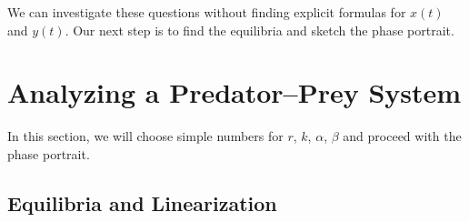\documentclass[10pt,letterpaper]{article}
\begin{document}
We can investigate these questions without finding
explicit formulas for $x(t)$ and $y(t)$. Our next step
is to find the equilibria and sketch the phase portrait.

\section{Analyzing a Predator--Prey System}
In this section, we will choose simple numbers for $r$, $k$, $\alpha$, $\beta$ and proceed with the phase portrait.

\subsection{Equilibria and Linearization}
\end{document}
